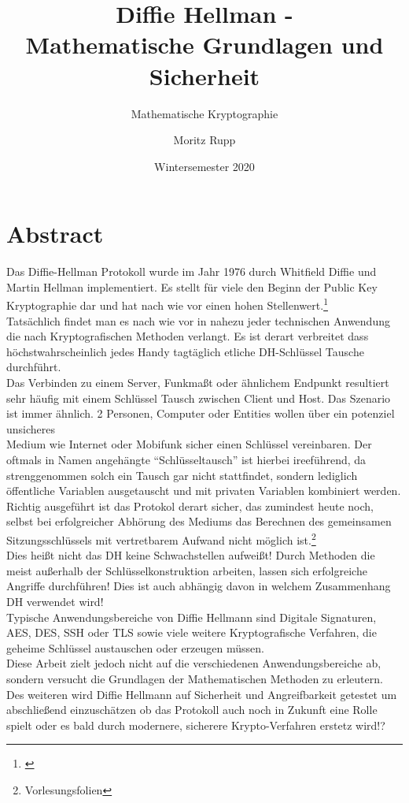 \documentclass[a4paper,12pt]{scrartcl}
\title{Diffie Hellman -\\Mathematische Grundlagen und Sicherheit}
\subtitle{Mathematische Kryptographie}
\author{Moritz Rupp}
\date{Wintersemester 2020}
\begin{document}
\maketitle
\newpage
\tableofcontents
\newpage

\section{Abstract}

Das Diffie-Hellman Protokoll wurde im Jahr 1976 durch Whitfield Diffie und Martin Hellman implementiert. Es stellt für viele den Beginn der Public Key Kryptographie dar und hat nach wie vor einen hohen Stellenwert.\footnote{\cite{10.1007/978-3-540-39927-8_28}}\\ 
Tatsächlich findet man es nach wie vor in nahezu jeder technischen Anwendung die nach Kryptografischen Methoden verlangt. 
Es ist derart verbreitet dass höchstwahrscheinlich jedes Handy tagtäglich etliche DH-Schlüssel Tausche durchführt.\\
Das Verbinden zu einem Server, Funkmaßt oder ähnlichem Endpunkt resultiert sehr häufig mit einem Schlüssel Tausch zwischen Client und Host. 
Das Szenario ist immer ähnlich. 2 Personen, Computer oder Entities wollen über ein potenziel unsicheres \\Medium wie Internet oder Mobifunk sicher einen Schlüssel vereinbaren. 
Der oftmals in Namen angehängte “Schlüsseltausch” ist hierbei ireeführend, da strenggenommen solch ein Tausch gar nicht stattfindet, sondern lediglich öffentliche Variablen ausgetauscht und mit privaten Variablen kombiniert werden. \\
Richtig ausgeführt ist das Protokol derart sicher, das zumindest heute noch, selbst bei erfolgreicher Abhörung des Mediums das Berechnen des gemeinsamen Sitzungsschlüssels mit vertretbarem Aufwand nicht möglich ist.\footnote{Vorlesungsfolien}\\
Dies heißt nicht das DH keine Schwachstellen aufweißt! Durch Methoden die meist außerhalb der Schlüsselkonstruktion arbeiten, lassen sich erfolgreiche Angriffe durchführen! Dies ist auch abhängig davon in welchem Zusammenhang DH verwendet wird!\\
Typische Anwendungsbereiche von Diffie Hellmann sind Digitale Signaturen, AES, DES, SSH oder TLS sowie viele weitere Kryptografische Verfahren, die geheime Schlüssel austauschen oder erzeugen müssen.\\
Diese Arbeit zielt jedoch nicht auf die verschiedenen Anwendungsbereiche ab, sondern versucht die Grundlagen der Mathematischen Methoden zu erleutern. Des weiteren wird Diffie Hellmann auf Sicherheit und Angreifbarkeit getestet um abschließend einzuschätzen ob das Protokoll auch noch in Zukunft eine Rolle spielt oder es bald durch modernere, sicherere Krypto-Verfahren erstetz wird!?
 
\end{document}
